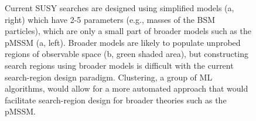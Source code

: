 \documentclass[letter, USenglish, 11pt, subfigure]{article}
\begin{document}
\begin{figure}[!htbp]
  \centering
  \hspace{3mm}
  \caption{Current SUSY searches are designed using simplified models (a, right) which have 2-5 parameters (e.g., masses of the BSM particles), which are only a small part of broader models such as the pMSSM (a, left). Broader models are likely to populate unprobed regions of observable space (b, green shaded area), but constructing search regions using broader models is difficult with the current search-region design paradigm. Clustering, a group of ML algorithms, would allow for a more automated approach that would facilitate search-region design for broader theories such as the pMSSM.}
  \label{fig:modelCartoon}
\end{figure}
\end{document}
